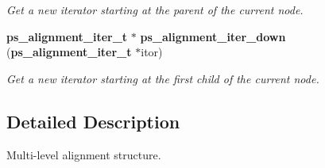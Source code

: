 \begin{DoxyCompactItemize}
\begin{DoxyCompactList}\small\item\em Get a new iterator starting at the parent of the current node. \end{DoxyCompactList}\item 
{\bf ps\+\_\+alignment\+\_\+iter\+\_\+t} $\ast$ {\bf ps\+\_\+alignment\+\_\+iter\+\_\+down} ({\bf ps\+\_\+alignment\+\_\+iter\+\_\+t} $\ast$itor)\label{ps__alignment_8c_a6356f643a01e2071c6f00f8a5d56565a}

\begin{DoxyCompactList}\small\item\em Get a new iterator starting at the first child of the current node. \end{DoxyCompactList}\end{DoxyCompactItemize}


\subsection{Detailed Description}
Multi-\/level alignment structure. 

